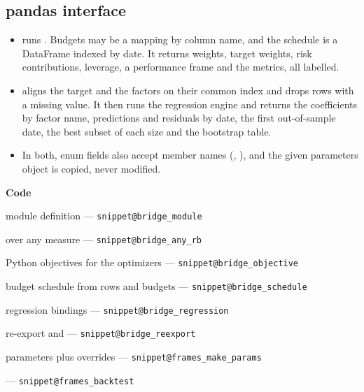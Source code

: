 \documentclass[11pt,a4paper]{article}
\makeatletter
\newcommand{\snippetsource}[1]{\csname snippet@#1\endcsname}
\newcommand{\snippet}[3]{%
  }
\newenvironment{codepointers}{%
  \par\smallskip\begingroup\footnotesize\noindent\textcolor{blue!50!black}{\textbf{Code}}\par\nopagebreak
  \begin{list}{}{\setlength{\leftmargin}{1.2em}\setlength{\itemsep}{0pt}\setlength{\parsep}{0pt}\setlength{\topsep}{1pt}}}%
  {\end{list}\endgroup\smallskip}
\newcommand{\codeitem}[2]{\item #2 --- \texttt{\snippetsource{#1}}}
\makeatother
\begin{document}
\subsection{pandas interface}
\begin{itemize}
  \item {}
        runs . Budgets may be a mapping by column name, and
        the schedule is a DataFrame indexed by date. It returns weights, target weights,
        risk contributions, leverage, a performance frame and the metrics, all labelled.
  \item {} aligns the
        target and the factors on their common index and drops rows with a missing value.
        It then runs the regression engine and returns the coefficients by factor name,
        predictions and residuals by date, the first out-of-sample date, the best subset
        of each size and the bootstrap table.
  \item In both, enum fields also accept member names (,
        ), and the given parameters object is copied, never
        modified.
\end{itemize}
\snippet{frames_regress}{Python}{\code{frames.regress}: alignment, engine and labelled results}
\begin{codepointers}
  \codeitem{bridge_module}{module definition}
  \codeitem{bridge_any_rb}{ over any measure}
  \codeitem{bridge_objective}{Python objectives for the optimizers}
  \codeitem{bridge_schedule}{budget schedule from rows and budgets}
  \codeitem{bridge_regression}{regression bindings}
  \codeitem{bridge_reexport}{re-export and }
  \codeitem{frames_make_params}{parameters plus overrides}
  \codeitem{frames_backtest}{}
\end{codepointers}
\end{document}
